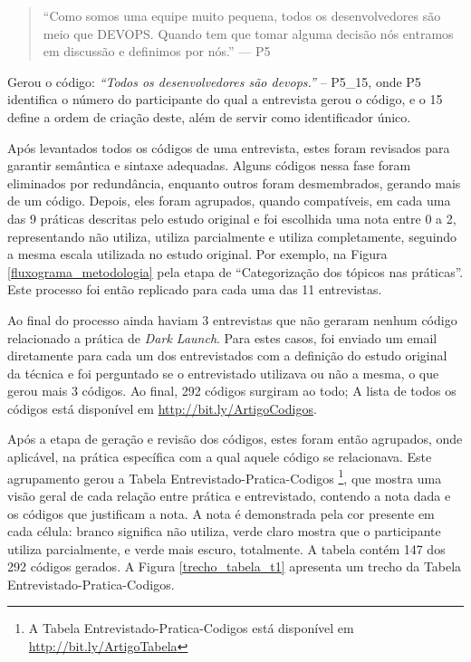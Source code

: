 \begin{quote}
    ``Como somos uma equipe muito pequena, todos os desenvolvedores são meio que DEVOPS. Quando tem que tomar alguma decisão nós entramos em discussão e definimos por nós.'' --- P5
\end{quote}

Gerou o código: \emph{``Todos os desenvolvedores são devops.''} -- P5\_15, onde P5 identifica o número do participante do qual a entrevista gerou o código, e o 15 define a ordem de criação deste, além de servir como identificador único.

Após levantados todos os códigos de uma entrevista, estes foram revisados para garantir semântica e sintaxe adequadas. Alguns códigos nessa fase foram eliminados por redundância, enquanto outros foram desmembrados, gerando mais de um código. Depois, eles foram agrupados, quando compatíveis, em cada uma das 9 práticas descritas pelo estudo original e foi escolhida uma nota entre 0 a 2, representando não utiliza, utiliza parcialmente e utiliza completamente, seguindo a mesma escala utilizada no estudo original. Por exemplo, na Figura \ref{fluxograma_metodologia} pela etapa de ``Categorização dos tópicos nas práticas''. Este processo foi então replicado para cada uma das 11 entrevistas.

Ao final do processo ainda haviam 3 entrevistas que não geraram nenhum código relacionado a prática de \emph{Dark Launch}. Para estes casos, foi enviado um email diretamente para cada um dos entrevistados com a definição do estudo original da técnica e foi perguntado se o entrevistado utilizava ou não a mesma, o que gerou mais 3 códigos. Ao final, 292 códigos surgiram ao todo; A lista de todos os códigos está disponível em \url{http://bit.ly/ArtigoCodigos}.

Após a etapa de geração e revisão dos códigos, estes foram então agrupados, onde aplicável, na prática específica com a qual aquele código se relacionava. Este agrupamento gerou a Tabela Entrevistado-Pratica-Codigos \footnote{A Tabela Entrevistado-Pratica-Codigos está disponível em \url{http://bit.ly/ArtigoTabela}}, que mostra uma visão geral de cada relação entre prática e entrevistado, contendo a nota dada e os códigos que justificam a nota. A nota é demonstrada pela cor presente em cada célula: branco significa não utiliza, verde claro mostra que o participante utiliza parcialmente, e verde mais escuro, totalmente. A tabela contém 147 dos 292 códigos gerados. A Figura \ref{trecho_tabela_t1} apresenta um trecho da Tabela Entrevistado-Pratica-Codigos.

